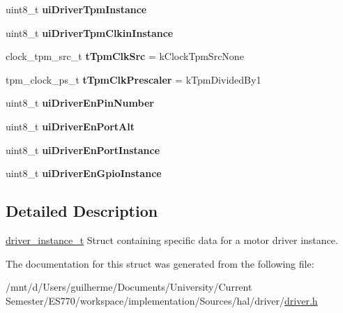 \begin{DoxyCompactItemize}
\item 
\hypertarget{structdriver__instance__t_a44663bfa878853938f1bdad536fd35b7}{uint8\-\_\-t {\bfseries ui\-Driver\-Tpm\-Instance}}\label{structdriver__instance__t_a44663bfa878853938f1bdad536fd35b7}

\item 
\hypertarget{structdriver__instance__t_a0b559c218b89af667912f82edd458734}{uint8\-\_\-t {\bfseries ui\-Driver\-Tpm\-Clkin\-Instance}}\label{structdriver__instance__t_a0b559c218b89af667912f82edd458734}

\item 
\hypertarget{structdriver__instance__t_ad76cc0556b525758d279459843138f5b}{clock\-\_\-tpm\-\_\-src\-\_\-t {\bfseries t\-Tpm\-Clk\-Src} = k\-Clock\-Tpm\-Src\-None}\label{structdriver__instance__t_ad76cc0556b525758d279459843138f5b}

\item 
\hypertarget{structdriver__instance__t_ab2d6b0a24053ce8936798d00e0eaa788}{tpm\-\_\-clock\-\_\-ps\-\_\-t {\bfseries t\-Tpm\-Clk\-Prescaler} = k\-Tpm\-Divided\-By1}\label{structdriver__instance__t_ab2d6b0a24053ce8936798d00e0eaa788}

\item 
\hypertarget{structdriver__instance__t_a418300ea7942514884c5b6edef97f223}{uint8\-\_\-t {\bfseries ui\-Driver\-En\-Pin\-Number}}\label{structdriver__instance__t_a418300ea7942514884c5b6edef97f223}

\item 
\hypertarget{structdriver__instance__t_a2abe6b120f62dc6c75ee3e34b314d205}{uint8\-\_\-t {\bfseries ui\-Driver\-En\-Port\-Alt}}\label{structdriver__instance__t_a2abe6b120f62dc6c75ee3e34b314d205}

\item 
\hypertarget{structdriver__instance__t_a63e440f47a54aab7dc11895e6a29113d}{uint8\-\_\-t {\bfseries ui\-Driver\-En\-Port\-Instance}}\label{structdriver__instance__t_a63e440f47a54aab7dc11895e6a29113d}

\item 
\hypertarget{structdriver__instance__t_acd040855556543782b527796bcd7b1b4}{uint8\-\_\-t {\bfseries ui\-Driver\-En\-Gpio\-Instance}}\label{structdriver__instance__t_acd040855556543782b527796bcd7b1b4}

\end{DoxyCompactItemize}


\subsection{Detailed Description}
\hyperlink{structdriver__instance__t}{driver\-\_\-instance\-\_\-t} Struct containing specific data for a motor driver instance. 

The documentation for this struct was generated from the following file\-:\begin{DoxyCompactItemize}
\item 
/mnt/d/\-Users/guilherme/\-Documents/\-University/\-Current Semester/\-E\-S770/workspace/implementation/\-Sources/hal/driver/\hyperlink{driver_8h}{driver.\-h}\end{DoxyCompactItemize}
